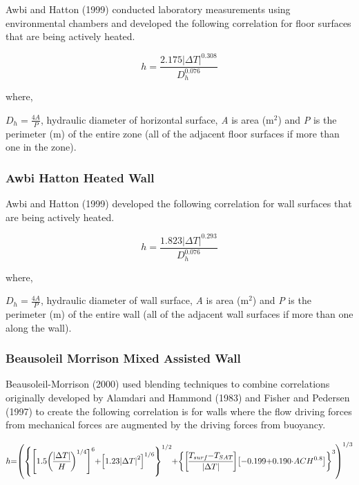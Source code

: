 Awbi and Hatton (1999) conducted laboratory measurements using environmental chambers and developed the following correlation for floor surfaces that are being actively heated.

\begin{equation}
h = \frac{{2.175{{\left| {\Delta T} \right|}^{0.308}}}}{{D_h^{0.076}}}
\end{equation}

where,

\({D_h} = \frac{{4A}}{P}\), hydraulic diameter of horizontal surface, \emph{A} is area (m\(^{2}\)) and \emph{P} is the perimeter (m) of the entire zone (all of the adjacent floor surfaces if more than one in the zone).

\subsubsection{Awbi Hatton Heated Wall}\label{awbi-hatton-heated-wall}

Awbi and Hatton (1999) developed the following correlation for wall surfaces that are being actively heated.

\begin{equation}
h = \frac{{1.823{{\left| {\Delta T} \right|}^{0.293}}}}{{D_h^{0.076}}}
\end{equation}

where,

\({D_h} = \frac{{4A}}{P}\), hydraulic diameter of wall surface, \emph{A} is area (m\(^{2}\)) and \emph{P} is the perimeter (m) of the entire wall (all of the adjacent wall surfaces if more than one along the wall).

\subsubsection{Beausoleil Morrison Mixed Assisted Wall}\label{beausoleil-morrison-mixed-assisted-wall}

Beausoleil-Morrison (2000) used blending techniques to combine correlations originally developed by Alamdari and Hammond (1983) and Fisher and Pedersen (1997) to create the following correlation is for walls where the flow driving forces from mechanical forces are augmented by the driving forces from buoyancy.

\begin{equation}
\medmuskip=0mu
\thinmuskip=0mu
\thickmuskip=0mu
\nulldelimiterspace=0pt
\scriptspace=0pt
h = \left( 
\left\{
\left[1.5\left(\frac{\left|\Delta T\right|}{H}\right)^{1/4}\right]^6 +
\left[1.23\left|\Delta T\right|^2\right]^{1/6}
\right\}^{1/2} + 
\left\{
\left[\frac{T_{surf}-T_{SAT}}{\left|\Delta T\right|}\right]
\left[-0.199+0.190\cdot ACH^{0.8}\right]
\right\}^3
\right)^{1/3}
\end{equation}

